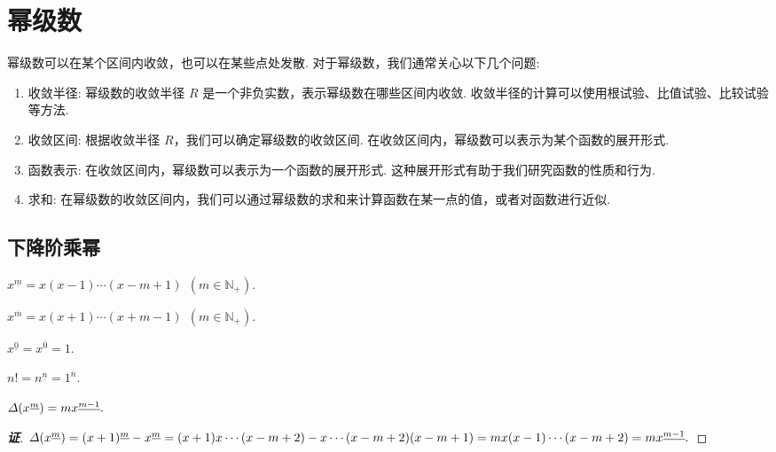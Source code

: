 \section{幂级数}

幂级数可以在某个区间内收敛，也可以在某些点处发散. 对于幂级数，我们通常关心以下几个问题: 

\begin{enumerate}
    \item 收敛半径: 幂级数的收敛半径 $R$ 是一个非负实数，表示幂级数在哪些区间内收敛. 收敛半径的计算可以使用根试验、比值试验、比较试验等方法.
    \item 收敛区间: 根据收敛半径 $R$，我们可以确定幂级数的收敛区间. 在收敛区间内，幂级数可以表示为某个函数的展开形式.
    \item 函数表示: 在收敛区间内，幂级数可以表示为一个函数的展开形式. 这种展开形式有助于我们研究函数的性质和行为.
    \item 求和: 在幂级数的收敛区间内，我们可以通过幂级数的求和来计算函数在某一点的值，或者对函数进行近似.
\end{enumerate}

\subsection{下降阶乘幂}

\begin{definition}[下降阶乘幂]
    $x^{\underline{m} }=x(x-1)\cdots(x-m+1)~~(m\in\mathbb{N}_+).$
\end{definition}

\begin{definition}[上升阶乘幂]
    $x^{\overline{m}}=x(x+1)\cdots(x+m-1)~~(m\in\mathbb{N}_+).$
\end{definition}

\begin{definition}
    $x^{\underline{0}}=x^{\overline{0}}=1.$
\end{definition}

\begin{theorem}[阶乘与阶乘幂]
    $n!=n^{\underline{n}}=1^{\overline{n}}.$
\end{theorem}

\begin{theorem}
    $\varDelta \qty(x^{\underline{m}})=mx^{\underline{m-1}}.$
\end{theorem}
\begin{proof}[{\songti \textbf{证}}]
    $\varDelta\qty(x^{\underline{m}})=(x+1)^{\underline{m}}-x^{\underline{m}}=(x+1)x\cdots(x-m+2)-x\cdots(x-m+2)(x-m+1)=mx(x-1)\cdots(x-m+2)=mx^{\underline{m-1}}.$
\end{proof}

